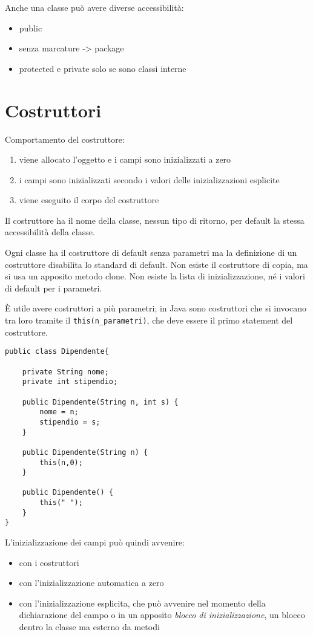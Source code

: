 Anche una classe può avere diverse accessibilità:
\begin{itemize}
\item public
\item senza marcature -> package
\item protected e private solo se sono classi interne
\end{itemize}

\section{Costruttori}
Comportamento del costruttore:
\begin{enumerate}
\item viene allocato l'oggetto e i campi sono inizializzati a zero
\item i campi sono inizializzati secondo i valori delle inizializzazioni esplicite
\item viene eseguito il corpo del costruttore
\end{enumerate}
Il costruttore ha il nome della classe, nessun tipo di ritorno, per default la stessa accessibilità della classe.

Ogni classe ha il costruttore di default senza parametri ma la definizione di un costruttore disabilita lo standard di default.
Non esiste il costruttore di copia, ma si usa un apposito metodo clone.
Non esiste la lista di inizializzazione, né i valori di default per i parametri.

È utile avere costruttori a più parametri; in Java sono costruttori che si invocano tra loro tramite il \texttt{this(n\_parametri)}, che deve essere il primo statement del costruttore.

\begin{lstlisting}
public class Dipendente{
    
    private String nome;
    private int stipendio;
    
    public Dipendente(String n, int s) {
        nome = n;
        stipendio = s;
    }

    public Dipendente(String n) {
        this(n,0);
    }

    public Dipendente() {
        this(" ");
    }    
}
\end{lstlisting}
L'inizializzazione dei campi può quindi avvenire:
\begin{itemize}
\item con i costruttori
\item con l'inizializzazione automatica a zero
\item con l'inizializzazione esplicita, che può avvenire nel momento della dichiarazione del campo o in un apposito \textit{blocco di inizializzazione}, un blocco dentro la classe ma esterno da metodi
\end{itemize}

